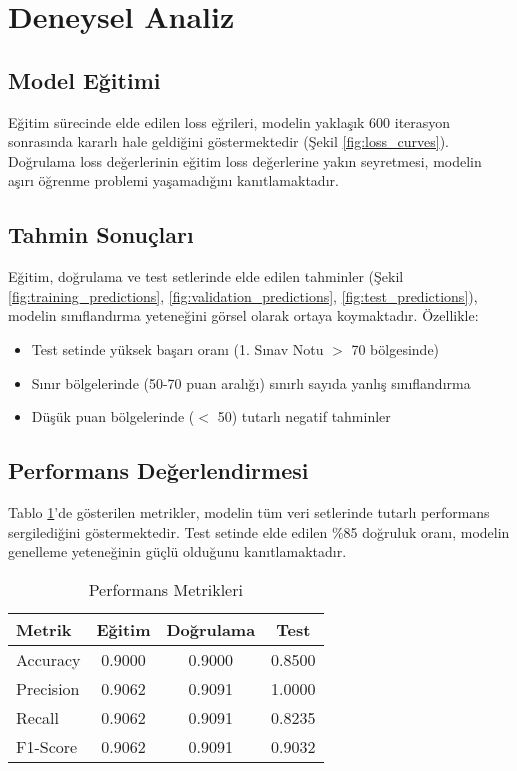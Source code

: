 \documentclass[conference]{IEEEtran}
\begin{document}
\section{Deneysel Analiz}

\subsection{Model Eğitimi}
Eğitim sürecinde elde edilen loss eğrileri, modelin yaklaşık 600 iterasyon
sonrasında kararlı hale geldiğini göstermektedir (Şekil \ref{fig:loss_curves}).
Doğrulama loss değerlerinin eğitim loss değerlerine yakın seyretmesi, modelin
aşırı öğrenme problemi yaşamadığını kanıtlamaktadır.


\subsection{Tahmin Sonuçları}
Eğitim, doğrulama ve test setlerinde elde edilen tahminler (Şekil
\ref{fig:training_predictions}, \ref{fig:validation_predictions},
\ref{fig:test_predictions}), modelin sınıflandırma yeteneğini görsel olarak
ortaya koymaktadır. Özellikle:

\begin{itemize}
\item Test setinde yüksek başarı oranı (1. Sınav Notu $>$ 70 bölgesinde)
\item Sınır bölgelerinde (50-70 puan aralığı) sınırlı sayıda yanlış sınıflandırma
\item Düşük puan bölgelerinde ($<$ 50) tutarlı negatif tahminler
\end{itemize}

\subsection{Performans Değerlendirmesi}
Tablo \ref{tab:performance}'de gösterilen metrikler, modelin tüm veri
setlerinde tutarlı performans sergilediğini göstermektedir. Test setinde elde
edilen \%85 doğruluk oranı, modelin genelleme yeteneğinin güçlü olduğunu
kanıtlamaktadır.

\begin{table}[!t]
\caption{Performans Metrikleri}
\label{tab:performance}
\centering
\begin{tabular}{|l|c|c|c|}
\hline
\textbf{Metrik} & \textbf{Eğitim} & \textbf{Doğrulama} & \textbf{Test} \\
\hline
Accuracy & 0.9000 & 0.9000 & 0.8500 \\
Precision & 0.9062 & 0.9091 & 1.0000 \\
Recall & 0.9062 & 0.9091 & 0.8235 \\
F1-Score & 0.9062 & 0.9091 & 0.9032 \\
\hline
\end{tabular}
\end{table}
\end{document}
